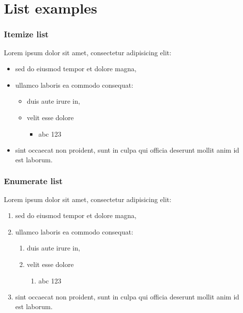 \documentclass{beamer}
\begin{document}
\section{List examples}

\begin{frame}

  \frametitle{Itemize list}
  Lorem ipsum dolor sit amet, consectetur adipisicing elit:
  \begin{itemize}
    \item sed do eiusmod tempor et dolore magna,
    \item ullamco laboris ea commodo consequat:
          \begin{itemize}
            \item duis aute irure in,
            \item velit esse dolore
                  \begin{itemize}
                    \item abc 123
                  \end{itemize}
          \end{itemize}
    \item sint occaecat non proident, sunt in culpa qui officia
          deserunt mollit anim id est laborum.
  \end{itemize}

\end{frame}

\begin{frame}
  \frametitle{Enumerate list}

  Lorem ipsum dolor sit amet, consectetur adipisicing elit:
  \begin{enumerate}
    \item sed do eiusmod tempor et dolore magna,
    \item ullamco laboris ea commodo consequat:
          \begin{enumerate}
            \item duis aute irure in,
            \item velit esse dolore
                  \begin{enumerate}
                    \item abc 123
                  \end{enumerate}
          \end{enumerate}
    \item sint occaecat non proident, sunt in culpa qui officia
          deserunt mollit anim id est laborum.
  \end{enumerate}

\end{frame}
\end{document}

